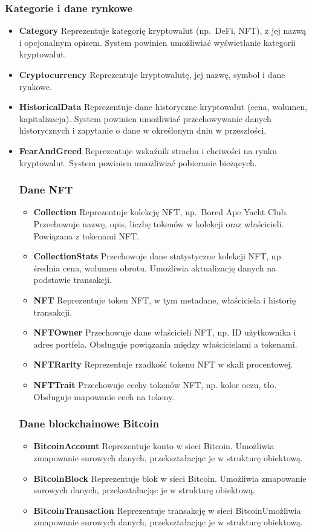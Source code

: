 \subsubsection{Kategorie i dane rynkowe}
\begin{itemize}
\item \textbf{Category} Reprezentuje kategorię kryptowalut (np.\ DeFi, NFT), z jej nazwą i opcjonalnym opisem. System powinien umożliwiać wyświetlanie kategorii kryptowalut.
\item \textbf{Cryptocurrency} Reprezentuje kryptowalutę, jej nazwę, symbol i dane rynkowe.
\item \textbf{HistoricalData} Reprezentuje dane historyczne kryptowalut (cena, wolumen, kapitalizacja). System powinien umożliwiać przechowywanie danych historycznych i zapytanie o dane w określonym dniu w przeszłości.
\item \textbf{FearAndGreed} Reprezentuje wskaźnik strachu i chciwości na rynku kryptowalut. System powinien umożliwiać pobieranie bieżących.

\subsubsection{Dane NFT}
\begin{itemize}
\item \textbf{Collection} Reprezentuje kolekcję NFT, np.\ Bored Ape Yacht Club. Przechowuje nazwę, opis, liczbę tokenów w kolekcji oraz właścicieli. Powiązana z tokenami NFT.
\item \textbf{CollectionStats} Przechowuje dane statystyczne kolekcji NFT, np. średnia cena, wolumen obrotu. Umożliwia aktualizację danych na podstawie transakcji.
\item \textbf{NFT} Reprezentuje token NFT, w tym metadane, właściciela i historię transakcji.
\item \textbf{NFTOwner} Przechowuje dane właścicieli NFT, np. ID użytkownika i adres portfela. Obsługuje powiązania między właścicielami a tokenami.
\item \textbf{NFTRarity} Reprezentuje rzadkość tokenu NFT w skali procentowej.
\item \textbf{NFTTrait} Przechowuje cechy tokenów NFT, np. kolor oczu, tło. Obsługuje mapowanie cech na tokeny.
\end{itemize}

\subsubsection{Dane blockchainowe Bitcoin}
\begin{itemize}
\item \textbf{BitcoinAccount} Reprezentuje konto w sieci Bitcoin. Umożliwia zmapowanie surowych danych, przekształacjąc je w strukturę obiektową.
\item \textbf{BitcoinBlock} Reprezentuje blok w sieci Bitcoin. Umożliwia zmapowanie surowych danych, przekształacjąc je w strukturę obiektową.
\item \textbf{BitcoinTransaction} Reprezentuje transakcję w sieci BitcoinUmożliwia zmapowanie surowych danych, przekształacjąc je w strukturę obiektową.
\end{itemize}


\end{itemize}
